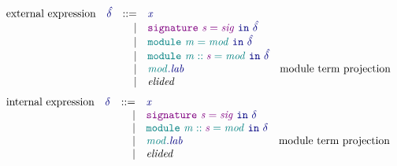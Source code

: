 \documentclass[12pt,fleqn]{article}
\newcommand{\blue}[1]{\textcolor{blue}{#1}}
\newcommand{\purple}[1]{\textcolor{purple}{#1}}
\newcommand{\teal}[1]{\textcolor{teal}{#1}}
\newcommand{\bluett}[1]{\blue{\mathtt{#1}}}
\newcommand{\purplett}[1]{\purple{\mathtt{#1}}}
\newcommand{\tealtt}[1]{\teal{\mathtt{#1}}}
\newcommand{\blueit}[1]{\blue{\mathit{#1}}}
\newcommand{\purpleit}[1]{\purple{\mathit{#1}}}
\newcommand{\tealit}[1]{\teal{\mathit{#1}}}
\newcommand{\uexp}[1][]{\blueit{\hat{\delta#1}}}
\newcommand{\uexpvar}[1][]{\blueit{x#1}}
\renewcommand{\exp}[1][]{\blueit{\delta#1}}
\newcommand{\expvar}[1][]{\blueit{x#1}}
\newcommand{\sig}[1][]{\purpleit{sig#1}}
\newcommand{\sigvar}[1][]{\purpleit{s#1}}
\renewcommand{\mod}[1][]{\tealit{mod#1}}
\newcommand{\modvar}[1][]{\tealit{m#1}}
\newcommand{\lab}[1][]{\mathit{lab#1}}
\newcommand{\LetSig}[2]{\purplett{signature~#1=#2}\bluett{~in~\exp}}
\newcommand{\uLetSig}[2]{\purplett{signature~#1=#2}\bluett{~in~\uexp}}
\newcommand{\ModTermPrj}[2]{\bluett{#1.#2}}
\newcommand{\uModTermPrj}[2]{\bluett{#1.#2}}
\newcommand{\LetMod}[2]{\tealtt{module~#1=#2}\bluett{~in~\exp}}
\newcommand{\uLetMod}[2]{\tealtt{module~#1=#2}\bluett{~in~\uexp}}
\begin{document}
\[\begin{array}{rcrlr}
    \textrm{external expression} & \uexp & ::=
                                 & \uexpvar \\
                                 && \vert & \uLetSig{\sigvar}{\sig} \\
                                 && \vert & \uLetMod{\modvar}{\mod} \\
                                 && \vert & \uLetMod{\modvar :: \sigvar}{\mod} \\
                                 && \vert & \uModTermPrj{\mod}{\lab} & \textrm{module term projection} \\
                                 && \vert & \textit{elided} \\
\end{array}\]
\[\begin{array}{rcrlr}
    \textrm{internal expression} & \exp & ::=
                                 & \expvar \\
                                 && \vert & \LetSig{\sigvar}{\sig} \\
                                 && \vert & \LetMod{\modvar :: \sigvar}{\mod} \\
                                 && \vert & \ModTermPrj{\mod}{\lab} & \textrm{module term projection} \\
                                 && \vert & \textit{elided} \\
\end{array}\]
\end{document}

